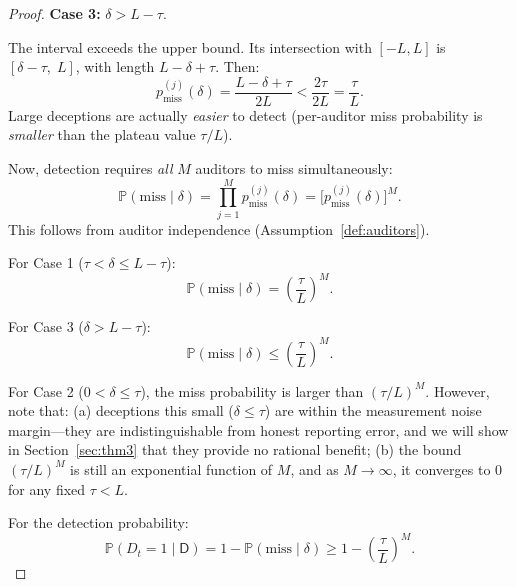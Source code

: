 \documentclass[11pt,a4paper]{article}
\theoremstyle{definition}
\theoremstyle{remark}
\newcommand{\Pbb}{\mathbb{P}}
\newcommand{\dishonest}{\mathsf{D}}
\newcommand{\deception}{\delta}
\newcommand{\threshold}{\tau}
\newcommand{\tol}{L}
\begin{document}
\begin{proof}
\medskip\noindent\textbf{Case 3:} $\deception > \tol - \threshold$.

The interval exceeds the upper bound. Its intersection with $[-\tol, \tol]$ is $[\deception - \threshold,\; \tol]$, with length $\tol - \deception + \threshold$. Then:
\begin{equation}
    p_{\text{miss}}^{(j)}(\deception) = \frac{\tol - \deception + \threshold}{2\tol}
                                         < \frac{2\threshold}{2\tol} = \frac{\threshold}{\tol}.
\end{equation}
Large deceptions are actually \emph{easier} to detect (per-auditor miss probability is \emph{smaller} than the plateau value $\threshold/\tol$).

\medskip
Now, detection requires \emph{all} $M$ auditors to miss simultaneously:
\begin{equation}
    \Pbb(\text{miss} \mid \deception) = \prod_{j=1}^{M} p_{\text{miss}}^{(j)}(\deception)
    = \bigl[p_{\text{miss}}^{(j)}(\deception)\bigr]^M.
\end{equation}
This follows from auditor independence (Assumption~\ref{def:auditors}).

For Case 1 ($\threshold < \deception \leq \tol - \threshold$):
\begin{equation}
    \Pbb(\text{miss} \mid \deception) = \left(\frac{\threshold}{\tol}\right)^M.
\end{equation}

For Case 3 ($\deception > \tol - \threshold$):
\begin{equation}
    \Pbb(\text{miss} \mid \deception) \leq \left(\frac{\threshold}{\tol}\right)^M.
\end{equation}

For Case 2 ($0 < \deception \leq \threshold$), the miss probability is larger than $(\threshold/\tol)^M$. However, note that: (a) deceptions this small ($\deception \leq \threshold$) are within the measurement noise margin---they are indistinguishable from honest reporting error, and we will show in Section~\ref{sec:thm3} that they provide no rational benefit; (b) the bound $(\threshold/\tol)^M$ is still an exponential function of $M$, and as $M \to \infty$, it converges to 0 for any fixed $\threshold < \tol$.

For the detection probability:
\begin{equation}
    \Pbb(D_t = 1 \mid \dishonest) = 1 - \Pbb(\text{miss} \mid \deception)
    \geq 1 - \left(\frac{\threshold}{\tol}\right)^M.
\end{equation}


\end{proof}
\end{document}
